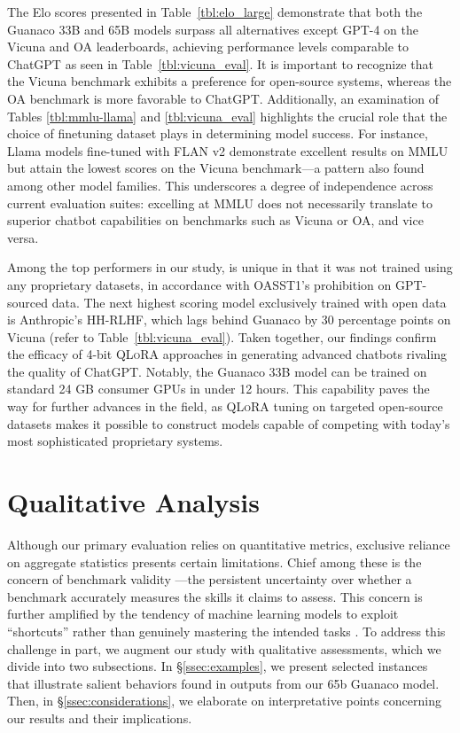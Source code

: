 The Elo scores presented in Table~\ref{tbl:elo_large} demonstrate that both the {Guanaco} 33B and 65B models surpass all alternatives except GPT-4 on the Vicuna and OA leaderboards, achieving performance levels comparable to ChatGPT as seen in Table~\ref{tbl:vicuna_eval}. It is important to recognize that the Vicuna benchmark exhibits a preference for open-source systems, whereas the OA benchmark is more favorable to ChatGPT. Additionally, an examination of Tables \ref{tbl:mmlu-llama} and \ref{tbl:vicuna_eval} highlights the crucial role that the choice of finetuning dataset plays in determining model success. For instance, Llama models fine-tuned with FLAN v2 demonstrate excellent results on MMLU but attain the lowest scores on the Vicuna benchmark—a pattern also found among other model families. This underscores a degree of independence across current evaluation suites: excelling at MMLU does not necessarily translate to superior chatbot capabilities on benchmarks such as Vicuna or OA, and vice versa.

Among the top performers in our study,  is unique in that it was not trained using any proprietary datasets, in accordance with OASST1’s prohibition on GPT-sourced data. The next highest scoring model exclusively trained with open data is Anthropic’s HH-RLHF, which lags behind {Guanaco} by 30 percentage points on Vicuna (refer to Table~\ref{tbl:vicuna_eval}). Taken together, our findings confirm the efficacy of 4-bit \textsc{QLoRA} approaches in generating advanced chatbots rivaling the quality of ChatGPT. Notably, the {Guanaco} 33B model can be trained on standard 24 GB consumer GPUs in under 12 hours. This capability paves the way for further advances in the field, as \textsc{QLoRA} tuning on targeted open-source datasets makes it possible to construct models capable of competing with today’s most sophisticated proprietary systems.

\section{Qualitative Analysis}

Although our primary evaluation relies on quantitative metrics, exclusive reliance on aggregate statistics presents certain limitations. Chief among these is the concern of benchmark validity \citep{liao2021we}—the persistent uncertainty over whether a benchmark accurately measures the skills it claims to assess. This concern is further amplified by the tendency of machine learning models to exploit ``shortcuts'' rather than genuinely mastering the intended tasks \citep{gururangan2018annotation, poliak2018hypothesis}. To address this challenge in part, we augment our study with qualitative assessments, which we divide into two subsections. In \S\ref{ssec:examples}, we present selected instances that illustrate salient behaviors found in outputs from our 65b {Guanaco} model. Then, in \S\ref{ssec:considerations}, we elaborate on interpretative points concerning our results and their implications.

